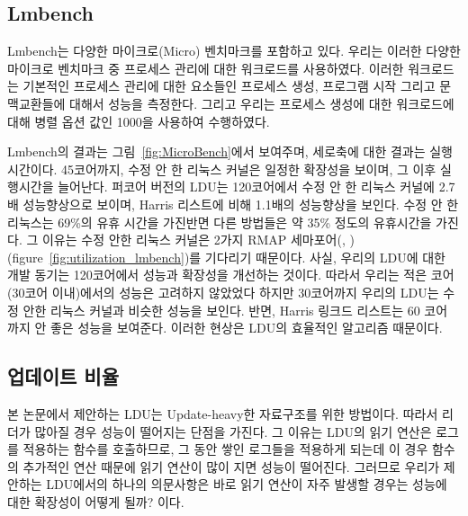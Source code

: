 \subsection{Lmbench}
Lmbench는 다양한 마이크로(Micro) 벤치마크를 포함하고 있다. 
우리는 이러한 다양한 마이크로 벤치마크 중 프로세스 관리에 대한 워크로드를 사용하였다. 
이러한 워크로드는 기본적인 프로세스 관리에 대한 요소들인 프로세스 생성, 
프로그램 시작 그리고 문맥교환들에 대해서 성능을 측정한다.
그리고 우리는 프로세스 생성에 대한 워크로드에 대해 병렬 옵션 값인 1000을 사용하여 수행하였다. 

Lmbench의 결과는 그림~\ref{fig:MicroBench}에서 보여주며, 세로축에 대한 결과는 실행 시간이다.
45코어까지, 수정 안 한 리눅스 커널은 일정한 확장성을 보이며, 그 이후 실행시간을 늘어난다.
퍼코어 버전의 LDU는 120코어에서 수정 안 한 리눅스 커널에 2.7배 성능향상으로 보이며, 
Harris 리스트에 비해 1.1배의 성능향상을 보인다.
수정 안 한 리눅스는 69\%의 유휴 시간을 가진반면 다른 방법들은 약 35\% 정도의 유휴시간을 가진다.
그 이유는 수정 안한 리눅스 커널은 2가지 RMAP 세마포어(,
)(figure~\ref{fig:utilization_lmbench})를 기다리기 때문이다. 
사실, 우리의 LDU에 대한 개발 동기는 120코어에서 성능과 확장성을 개선하는 것이다. 
따라서 우리는 적은 코어(30코어 이내)에서의 성능은 고려하지 않았었다
하지만 30코어까지 우리의 LDU는 수정 안한 리눅스 커널과 비슷한 성능을 보인다. 
반면, Harris 링크드 리스트는 60 코어 까지 안 좋은 성능을 보여준다. 
이러한 현상은 LDU의 효율적인 알고리즘 때문이다.

\subsection{업데이트 비율}

본 논문에서 제안하는 LDU는 Update-heavy한 자료구조를 위한 방법이다. 
따라서 리더가 많아질 경우 성능이 떨어지는 단점을 가진다. 
그 이유는 LDU의 읽기 연산은 로그를 적용하는  함수를 호출하므로, 
그 동안 쌓인 로그들을 적용하게 되는데 이 경우  함수의 
추가적인 연산 때문에 읽기 연산이 많이 지면 성능이 떨어진다.
그러므로 우리가 제안하는 LDU에서의 하나의 의문사항은 바로 읽기
연산이 자주 발생할 경우는 성능에 대한 확장성이 어떻게 될까? 이다.

